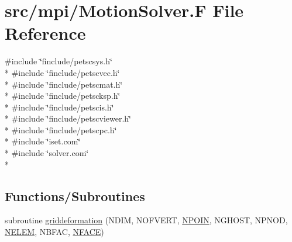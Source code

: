\hypertarget{mpi_2_motion_solver_8_f}{\section{src/mpi/\-Motion\-Solver.F File Reference}
\label{mpi_2_motion_solver_8_f}
}
{\ttfamily \#include \char`\"{}finclude/petscsys.\-h\char`\"{}}\\*
{\ttfamily \#include \char`\"{}finclude/petscvec.\-h\char`\"{}}\\*
{\ttfamily \#include \char`\"{}finclude/petscmat.\-h\char`\"{}}\\*
{\ttfamily \#include \char`\"{}finclude/petscksp.\-h\char`\"{}}\\*
{\ttfamily \#include \char`\"{}finclude/petscis.\-h\char`\"{}}\\*
{\ttfamily \#include \char`\"{}finclude/petscviewer.\-h\char`\"{}}\\*
{\ttfamily \#include \char`\"{}finclude/petscpc.\-h\char`\"{}}\\*
{\ttfamily \#include \char`\"{}iset.\-com\char`\"{}}\\*
{\ttfamily \#include \char`\"{}solver.\-com\char`\"{}}\\*
\subsection*{Functions/\-Subroutines}
\begin{DoxyCompactItemize}
\item 
subroutine \hyperlink{mpi_2_motion_solver_8_f_a256a1041b4e06832537fd6930a559785}{griddeformation} (N\-D\-I\-M, N\-O\-F\-V\-E\-R\-T, \hyperlink{mesh_8com_ae28c1572321efcd8715b974d87d20c58}{N\-P\-O\-I\-N}, N\-G\-H\-O\-S\-T, N\-P\-N\-O\-D, \hyperlink{mesh_8com_aee5e75b79d0e815c0603cfbccc618957}{N\-E\-L\-E\-M}, N\-B\-F\-A\-C, \hyperlink{mesh_8com_a78142d59d4cbb9fedbede16187658dd3}{N\-F\-A\-C\-E})
\end{DoxyCompactItemize}


